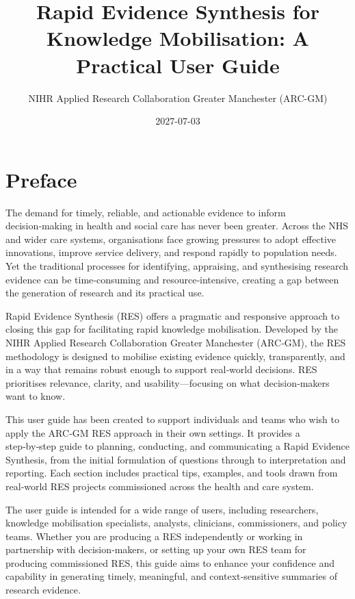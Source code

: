 \documentclass[
  letterpaper,
  DIV=11,
  numbers=noendperiod]{scrreprt}
\title{Rapid Evidence Synthesis for Knowledge Mobilisation: A Practical
User Guide}
\author{NIHR Applied Research Collaboration Greater Manchester (ARC-GM)}
\date{2027-07-03}
\renewcommand*\contentsname{Table of contents}
\newcommand\contentsname{Table of contents}
\begin{document}
\maketitle

\renewcommand*\contentsname{Table of contents}
{
\setcounter{tocdepth}{2}
\tableofcontents
}


\chapter*{Preface}\label{preface}


The demand for timely, reliable, and actionable evidence to inform
decision‑making in health and social care has never been greater. Across
the NHS and wider care systems, organisations face growing pressures to
adopt effective innovations, improve service delivery, and respond
rapidly to population needs. Yet the traditional processes for
identifying, appraising, and synthesising research evidence can be
time‑consuming and resource‑intensive, creating a gap between the
generation of research and its practical use.

Rapid Evidence Synthesis (RES) offers a pragmatic and responsive
approach to closing this gap for facilitating rapid knowledge
mobilisation. Developed by the NIHR Applied Research Collaboration
Greater Manchester (ARC‑GM), the RES methodology is designed to mobilise
existing evidence quickly, transparently, and in a way that remains
robust enough to support real‑world decisions. RES prioritises
relevance, clarity, and usability---focusing on what decision‑makers
want to know.

This user guide has been created to support individuals and teams who
wish to apply the ARC‑GM RES approach in their own settings. It provides
a step‑by‑step guide to planning, conducting, and communicating a Rapid
Evidence Synthesis, from the initial formulation of questions through to
interpretation and reporting. Each section includes practical tips,
examples, and tools drawn from real‑world RES projects commissioned
across the health and care system.

The user guide is intended for a wide range of users, including
researchers, knowledge mobilisation specialists, analysts, clinicians,
commissioners, and policy teams. Whether you are producing a RES
independently or working in partnership with decision‑makers, or setting
up your own RES team for producing commissioned RES, this guide aims to
enhance your confidence and capability in generating timely, meaningful,
and context‑sensitive summaries of research evidence.
\end{document}
